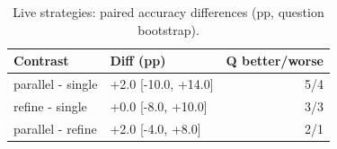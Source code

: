 \begin{table}[t]
\centering
\small
\caption{Live strategies: paired accuracy differences (pp, question bootstrap).}
\label{tab:T7b_live_paired}
\begin{tabular}{llr}
\toprule
Contrast & Diff (pp) & Q better/worse \\
\midrule
parallel - single & +2.0 [-10.0, +14.0] & 5/4 \\
refine - single & +0.0 [-8.0, +10.0] & 3/3 \\
parallel - refine & +2.0 [-4.0, +8.0] & 2/1 \\
\bottomrule
\end{tabular}
\end{table}
